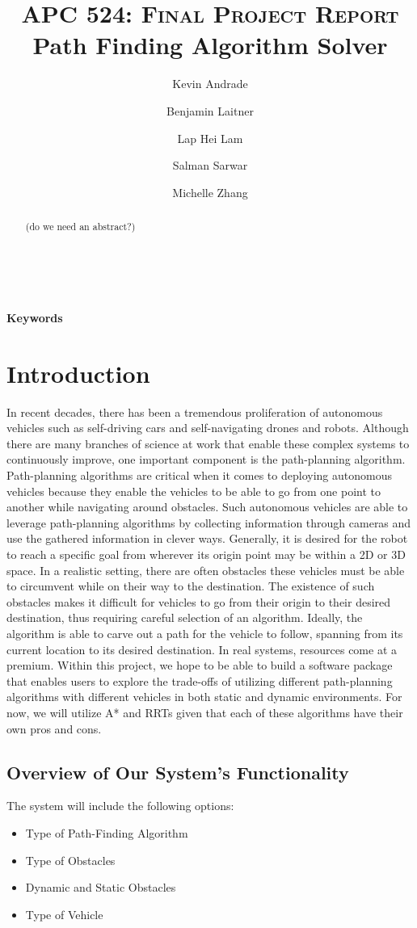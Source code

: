 \documentclass[10pt,twocolumn,letterpaper]{article}
\title{
		\usefont{OT1}{bch}{b}{n}
		\normalfont \normalsize \textsc{APC 524: Final Project Report} \\ [10pt]
		\huge Path Finding Algorithm Solver \\
}
\author[1]{Kevin Andrade}
\author[1]{Benjamin Laitner}
\author[1]{Lap Hei Lam}
\author[1]{Salman Sarwar}
\author[1]{Michelle Zhang}
\affil[1]{Princeton University}
\begin{document}
\maketitle

\begin{abstract}
(do we need an abstract?)
\end{abstract} \\ 
\\ 
{\textbf{Keywords} \\
}

\section*{Introduction}

In recent decades, there has been a tremendous proliferation of autonomous vehicles such as self-driving cars and self-navigating drones and robots. Although there are many branches of science at work that enable these complex systems to continuously improve, one important component is the path-planning algorithm. Path-planning algorithms are critical when it comes to deploying autonomous vehicles because they enable the vehicles to be able to go from one point to another while navigating around obstacles. Such autonomous vehicles are able to leverage path-planning algorithms by collecting information through cameras and use the gathered information in clever ways. 
Generally, it is desired for the robot to reach a specific goal from wherever its origin point may be within a 2D or 3D space. In a realistic setting, there are often obstacles these vehicles must be able to circumvent while on their way to the destination. The existence of such obstacles makes it difficult for vehicles to go from their origin to their desired destination, thus requiring careful selection of an algorithm. Ideally, the algorithm is able to carve out a path for the vehicle to follow, spanning from its current location to its desired destination.
In real systems, resources come at a premium. Within this project, we hope to be able to build a software package that enables users to explore the trade-offs of utilizing different path-planning algorithms with different vehicles in both static and dynamic environments. For now, we will utilize A* and RRTs given that each of these algorithms have their own pros and cons.

\subsection*{Overview of Our System's Functionality}
The system will include the following options:
\begin{itemize}
    \item Type of Path-Finding Algorithm
    \item Type of Obstacles
    \item Dynamic and Static Obstacles 
    \item Type of Vehicle
\end{itemize}
\end{document}
